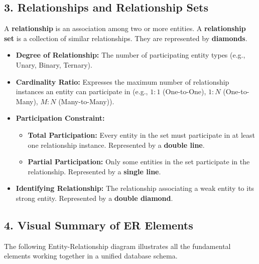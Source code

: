 \documentclass[12pt,a3paper]{article}
\begin{document}
\begin{enumerate}
\begin{tcolorbox}[enhanced,breakable,ansbox,colback=cA!4,colframe=cA,boxrule=0.8pt,arc=5pt,title={\textbf{Answer}},fonttitle=\bfseries\color{white},colbacktitle=cA]
\subsection*{3. Relationships and Relationship Sets}
A \textbf{relationship} is an association among two or more entities. A \textbf{relationship set} is a collection of similar relationships. They are represented by \textbf{diamonds}.
\begin{itemize}
    \item \textbf{Degree of Relationship:} The number of participating entity types (e.g., Unary, Binary, Ternary).
    \item \textbf{Cardinality Ratio:} Expresses the maximum number of relationship instances an entity can participate in (e.g., $1:1$ (One-to-One), $1:N$ (One-to-Many), $M:N$ (Many-to-Many)).
    \item \textbf{Participation Constraint:} 
    \begin{itemize}
        \item \textbf{Total Participation:} Every entity in the set must participate in at least one relationship instance. Represented by a \textbf{double line}.
        \item \textbf{Partial Participation:} Only some entities in the set participate in the relationship. Represented by a \textbf{single line}.
    \end{itemize}
    \item \textbf{Identifying Relationship:} The relationship associating a weak entity to its strong entity. Represented by a \textbf{double diamond}.
\end{itemize}

\vspace{1em}
\subsection*{4. Visual Summary of ER Elements}

The following Entity-Relationship diagram illustrates all the fundamental elements working together in a unified database schema.


\end{tcolorbox}
\end{enumerate}
\end{document}
